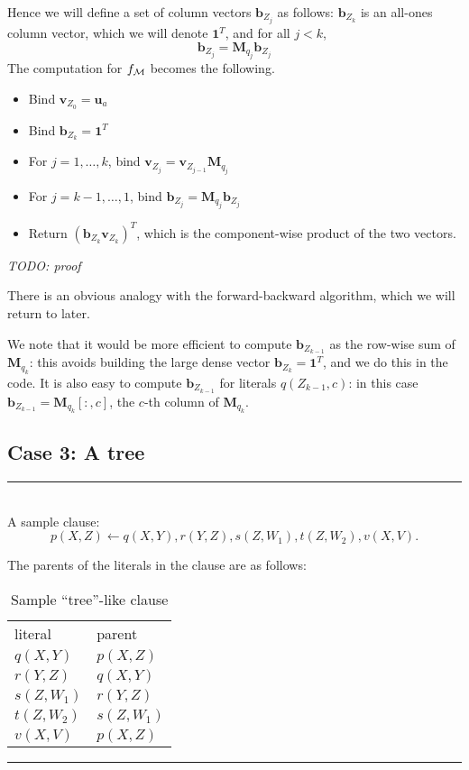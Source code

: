\documentclass[12pt]{article}
\newcommand{\yy}[1]{\textit{TODO: {#1}}}
\newcommand{\vek}[1]{\textbf{#1}}
\newcommand{\M}{\textbf{M}}
\begin{document}
Hence we will define a set of column vectors $\vek{b}_{Z_j}$ as
follows: $\vek{b}_{Z_k}$ is an all-ones column vector, which we
will denote $\vek{1}^T$, and for all
$j<k$, 
\[ \vek{b}_{Z_j} = \M_{q_j} \vek{b}_{Z_j}
\]
The computation for $f_{\cal M}$ becomes the following.
\begin{itemize}
\item Bind $\vek{v}_{Z_0} = \vek{u}_a$
\item Bind $\vek{b}_{Z_k} = \vek{1}^T$ 
\item For $j=1,\ldots,k$, bind $\vek{v}_{Z_j} = \vek{v}_{Z_{j-1}} \M_{q_j}$
\item For $j=k-1,\ldots,1$, bind $\vek{b}_{Z_j} = \M_{q_j} \vek{b}_{Z_j}$
\item Return $(\vek{b}_{Z_{k}} \vek{v}_{Z_{k}})^T$, which is the
  component-wise product of the two vectors.
\end{itemize}

\yy{proof}

There is an obvious analogy with the forward-backward algorithm,
which we will return to later.

We note that it would be more efficient to compute $\vek{b}_{Z_{k-1}}$
as the row-wise sum of $\M_{q_k}$: this avoids building the large
dense vector $\vek{b}_{Z_k} = \vek{1}^T$, and we do this in the code.
It is also easy to compute $\vek{b}_{Z_{k-1}}$ for literals
$q(Z_{k-1},c)$: in this case $\vek{b}_{Z_{k-1}} = \M_{q_k}[:,c]$, the
$c$-th column of $\M_{q_k}$.

\subsection{Case 3: A tree}

\begin{table}
\hrule

~\\

A sample clause:
\[ p(X,Z) \leftarrow q(X,Y),r(Y,Z),s(Z,W_1),t(Z,W_2),v(X,V).
\] 

The parents of the literals in the clause are as follows:

\begin{tabular}{ll}
literal & parent\\
$q(X,Y)$ & $p(X,Z)$ \\
$r(Y,Z)$ & $q(X,Y)$ \\
$s(Z,W_1)$ & $r(Y,Z)$ \\
$t(Z,W_2)$ & $s(Z,W_1)$ \\
$v(X,V)$ & $p(X,Z)$
\end{tabular}

\caption{Sample ``tree''-like clause}
\label{tab:tree}
\hrule
\end{table}
\end{document}
